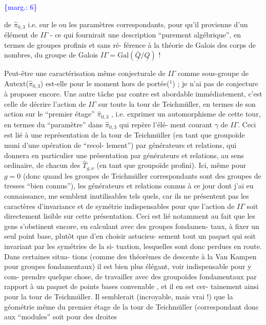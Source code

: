 \documentclass[11pt]{article}
\newcommand{\scanpage}[1]{\par\bigskip\noindent{\small\sffamily[scan #1]}\par}
\newcommand{\mspage}[1]{{\small\sffamily[p.\,#1]}}
\newcommand{\margin}[1]{\textcolor{blue}{\{\textsf{marg.:} #1\}}}
\begin{document}
\margin{6}

\clearpage
\scanpage{119/7}
\mspage{5}

de $\hat{\pi}_{0,3}$ i.e. sur le ou les paramètres correspondants, pour qu'il
provienne d'un élément de $I\!\Gamma$ - ce qui fournirait une description
``purement algébrique'', en termes de groupes profinis et sans ré-%
férence à la théorie de Galois des corps de nombres, du groupe de
Galois $I\!\Gamma = \mathrm{Gal}(\bar{\underline{Q}}/\underline{Q})$ !

Peut-être une caractérisation même conjecturale de $I\!\Gamma$
comme sous-groupe de Autext($\hat{\pi}_{0,3}$) est-elle pour le moment hors de
portée($^1$) ; je n'ai pas de conjecture à proposer encore. Une autre
tâche par contre est abordable immédiatement, c'est celle de décrire
l'action de $I\!\Gamma$ sur toute la tour de Teichmüller, en termes de son
action sur le ``premier étage'' $\hat{\pi}_{0,3}$ , i.e. exprimer un automorphisme
de cette tour, en termes du ``paramètre'' dans $\hat{\pi}_{0,3}$ qui repère l'élé-%
ment courant $\gamma$ de $I\!\Gamma$. Ceci est lié à une représentation de la tour
de Teichmüller (en tant que groupoïde muni d'une opération de ``recol-%
lement'') par générateurs et relations, qui donnera en particulier
une présentation par générateurs et relations, au sens ordinaire, de
chacun des $\hat{T}_{g,\nu}$ (en tant que groupoïde profini). Ici, même pour
$g = 0$ (donc quand les groupes de Teichmüller correspondants sont
des groupes de tresses ``bien connus''), les générateurs et relations
connus à ce jour dont j'ai eu connaissance, me semblent inutilisables
tels quels, car ils ne présentent pas les caractères d'invariance et
de symétrie indispensables pour que l'action de $I\!\Gamma$ soit directement
lisible sur cette présentation. Ceci est lié notamment au fait que
les gens s'obstinent encore, en calculant avec des groupes fondamen-%
taux, à fixer un seul point base, plutôt que d'en choisir astucieu-%
sement tout un paquet qui soit invariant par les symétries de la si-%
tuation, lesquelles sont donc perdues en route. Dans certaines situa-%
tions (comme des théorèmes de descente à la Van Kampen pour groupes
fondamentaux) il est bien plus élégant, voir indispensable pour y com-%
prendre quelque chose, de travailler avec des groupoïdes fondamentaux
par rapport à un paquet de points bases convenable , et il en est cer-%
tainement ainsi pour la tour de Teichmüller. Il semblerait (incroyable,
mais vrai !) que la géométrie même du premier étage de la tour de
Teichmüller (correspondant donc aux ``modules'' soit pour des droites
\end{document}
